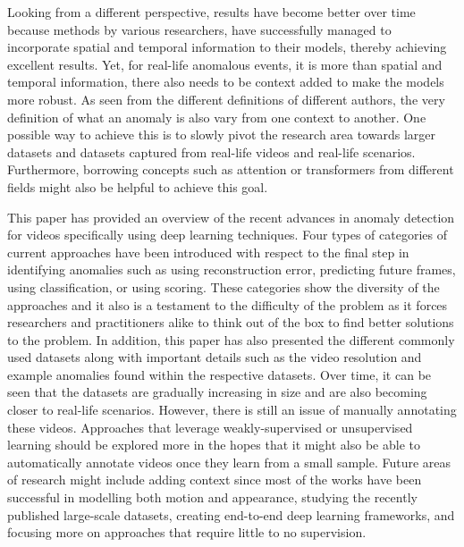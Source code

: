 Looking from a different perspective, results have become better over time because methods by various researchers, have successfully managed to incorporate spatial and temporal information to their models, thereby achieving excellent results. Yet, for real-life anomalous events, it is more than spatial and temporal information, there also needs to be context added to make the models more robust. As seen from the different definitions of different authors, the very definition of what an anomaly is also vary from one context to another. One possible way to achieve this is to slowly pivot the research area towards larger datasets and datasets captured from real-life videos and real-life scenarios. Furthermore, borrowing concepts such as attention or transformers from different fields might also be helpful to achieve this goal.

This paper has provided an overview of the recent advances in anomaly detection for videos specifically using deep learning techniques. Four types of categories of current approaches have been introduced with respect to the final step in identifying anomalies such as using reconstruction error, predicting future frames, using classification, or using scoring. These categories show the diversity of the approaches and it also is a testament to the difficulty of the problem as it forces researchers and practitioners alike to think out of the box to find better solutions to the problem. 
In addition, this paper has also presented the different commonly used datasets along with important details such as the video resolution and example anomalies found within the respective datasets. Over time, it can be seen that the datasets are gradually increasing in size and are also becoming closer to real-life scenarios. However, there is still an issue of manually annotating these videos. Approaches that leverage weakly-supervised or unsupervised learning should be explored more in the hopes that it might also be able to automatically annotate videos once they learn from a small sample.
Future areas of research might include adding context since most of the works have been successful in modelling both motion and appearance, studying the recently published large-scale datasets, creating end-to-end deep learning frameworks, and focusing more on approaches that require little to no supervision. 


